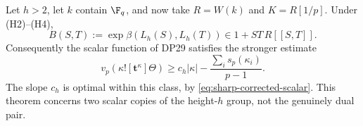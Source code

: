 \begin{theorem}\label{DP31}
Let $h>2$, let $k$ contain $\F_q$, and now take $R=W(k)$ and $K=R[1/p]$. Under (H2)--(H4),
\begin{equation}\label{eq:scalar-gauge}
 B(S,T):=\exp\beta(L_h(S),L_h(T))\in1+ST\,R[[S,T]].
\end{equation}
Consequently the scalar function of DP29 satisfies the stronger estimate
\begin{equation}\label{eq:scalar-full-slope}
 v_p(\kappa![\mathbf t^\kappa]\Theta)
 \ge c_h|\kappa|-\frac{\sum_i s_p(\kappa_i)}{p-1}.
\end{equation}
The slope $c_h$ is optimal within this class, by \eqref{eq:sharp-corrected-scalar}. This theorem concerns two scalar copies of the height-$h$ group, not the genuinely dual pair.
\end{theorem}
